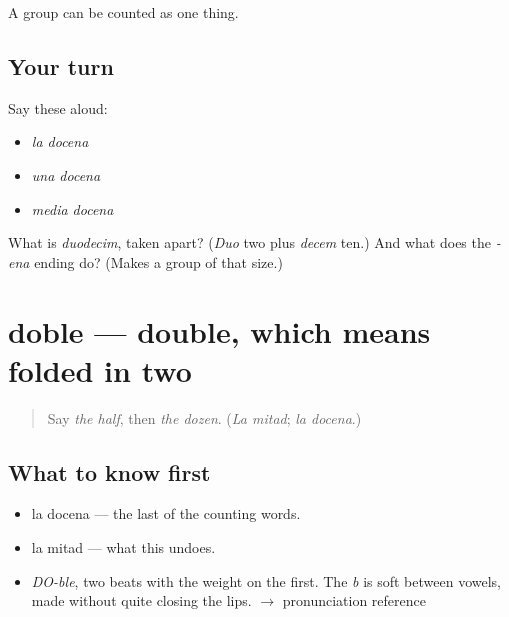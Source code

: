 \begin{grammarlens}[title={What you've built}]
A group can be counted as one thing.
\end{grammarlens}

\subsection*{Your turn}
Say these aloud:

\begin{itemize}
\raggedright
  \item \emph{la docena}
  \item \emph{una docena}
  \item \emph{media docena}
\end{itemize}

\begin{tcolorbox}[breakable,colback=teal!4,colframe=teal!35!black,title={Before you move on}]
What is \emph{duodecim}, taken apart? (\emph{Duo} two plus \emph{decem} ten.) And what does the \emph{-ena} ending do? (Makes a group of that size.)
\end{tcolorbox}
\section[doble]{doble — double, which means folded in two}

\label{lesson:ES-C344-doble}



\begin{quote}
Say \emph{the half}, then \emph{the dozen}. (\emph{La mitad}; \emph{la docena}.)
\end{quote}

\subsection*{What to know first}
\begin{itemize}
\raggedright
  \item la docena — the last of the counting words.
  \item la mitad — what this undoes.
\end{itemize}

\begin{sounds}
\begin{itemize}
\raggedright
  \item \emph{DO-ble}, two beats with the weight on the first. The \emph{b} is soft between vowels, made without quite closing the lips. $\to$ pronunciation reference
\end{itemize}
\end{sounds}

